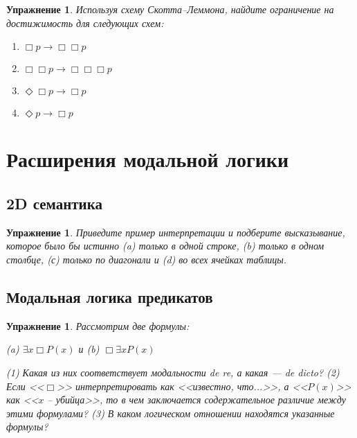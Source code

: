\documentclass[11pt]{article}
\newtheorem{exercise}[theorem]{Упражнение}
\begin{document}
\begin{exercise} Используя схему Скотта–Леммона, найдите ограничение на достижимость для следующих схем:
\begin{multicols}{2}
\begin{enumerate}
	\item $\Box p \to \Box \Box p$
	\item $\Box \Box p \to \Box \Box \Box p$
	\item $\Diamond \Box p \to \Box p$
	\item $\Diamond  p \to \Box p$
\end{enumerate}
\end{multicols}
\end{exercise}

\section{Расширения модальной логики}

\subsection{ 2D семантика}
\begin{exercise} Приведите пример интерпретации и подберите высказывание, которое было бы истинно (a) только в одной строке, (b) только в одном столбце, (с) только по диагонали и (d) во всех ячейках таблицы.
\end{exercise}

\subsection{Модальная логика предикатов}

\begin{exercise} Рассмотрим две формулы:

\begin{center}
(a) $\exists x \Box P(x)$ и (b) $\Box \exists x P(x)$	
\end{center}
(1) Какая из них соответствует модальности \textit{de re}, а какая — \textit{de dicto}? (2) Если <<$\Box$>> интерпретировать как <<известно, что...>>, а <<$P(x)$>> как <<$x$ – убийца>>, то в чем заключается содержательное различие между этими формулами? (3) В каком логическом отношении находятся указанные формулы?
\end{exercise}
\end{document}
